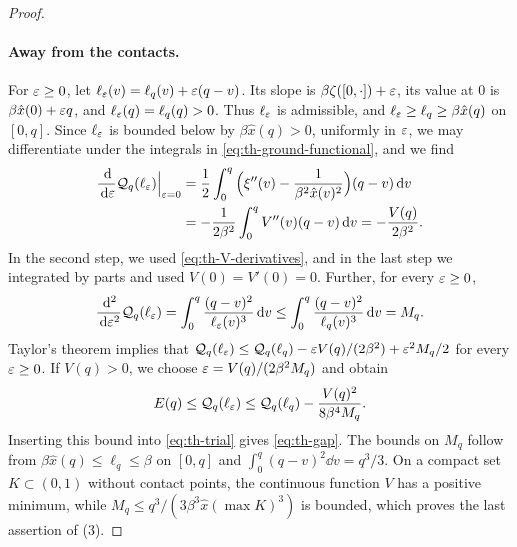 \begin{proof}
\paragraph{Away from the contacts.}
For $\varepsilon\ge0$, let $\ell_\varepsilon(v)=\ell_q(v)+\varepsilon(q-v)$. Its slope is $\beta\zeta([0,\cdot])+\varepsilon$, its value at $0$ is $\beta\hat x(0)+\varepsilon q$, and $\ell_\varepsilon(q)=\ell_q(q)>0$. Thus $\ell_\varepsilon$ is admissible, and $\ell_\varepsilon\ge\ell_q\ge\beta\hat x(q)$ on $[0,q]$. Since $\ell_\varepsilon$ is bounded below by $\beta\hat x(q)>0$, uniformly in $\varepsilon$, we may differentiate under the integrals in \eqref{eq:th-ground-functional}, and we find
\[
\begin{split}
\frac{\,\mathrm d}{\,\mathrm d\varepsilon}\mathcal Q_q(\ell_\varepsilon)\Big|_{\varepsilon=0}&=\frac12\int_0^q\Big(\xi''(v)-\frac1{\beta^2\hat x(v)^2}\Big)(q-v)\,\mathrm d v\\
&=-\frac1{2\beta^2}\int_0^qV''(v)(q-v)\,\mathrm d v=-\frac{V(q)}{2\beta^2}.
\end{split}
\]
In the second step, we used \eqref{eq:th-V-derivatives}, and in the last step we integrated by parts and used $V(0)=V'(0)=0$. Further, for every $\varepsilon\ge0$,
\[
\frac{\,\mathrm d^2}{\,\mathrm d\varepsilon^2}\mathcal Q_q(\ell_\varepsilon)=\int_0^q\frac{(q-v)^2}{\ell_\varepsilon(v)^3}\,\mathrm d v\le\int_0^q\frac{(q-v)^2}{\ell_q(v)^3}\,\mathrm d v=M_q.
\]
Taylor's theorem implies that $\mathcal Q_q(\ell_\varepsilon)\le\mathcal Q_q(\ell_q)-\varepsilon V(q)/(2\beta^2)+\varepsilon^2M_q/2$ for every $\varepsilon\ge0$. If $V(q)>0$, we choose $\varepsilon=V(q)/(2\beta^2M_q)$ and obtain
\[
E(q)\le\mathcal Q_q(\ell_\varepsilon)\le\mathcal Q_q(\ell_q)-\frac{V(q)^2}{8\beta^4M_q}.
\]
Inserting this bound into \eqref{eq:th-trial} gives \eqref{eq:th-gap}. The bounds on $M_q$ follow from $\beta\hat x(q)\le\ell_q\le\beta$ on $[0,q]$ and $\int_0^q(q-v)^2\dd v=q^3/3$. On a compact set $K\subset(0,1)$ without contact points, the continuous function $V$ has a positive minimum, while $M_q\le q^3/(3\beta^3\hat x(\max K)^3)$ is bounded, which proves the last assertion of (3).


\end{proof}
